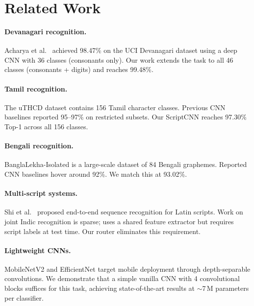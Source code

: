 \documentclass[10pt,twocolumn]{article}
\begin{document}
\section{Related Work}

\paragraph{Devanagari recognition.}
Acharya et al.~\cite{acharya2015} achieved 98.47\% on the UCI Devanagari
dataset using a deep CNN with 36 classes (consonants only).  Our work extends
the task to all 46 classes (consonants + digits) and reaches 99.48\%.

\paragraph{Tamil recognition.}
The uTHCD dataset \cite{uthcd} contains 156 Tamil character classes.  Previous
CNN baselines reported 95--97\% on restricted subsets.  Our ScriptCNN reaches
97.30\% Top-1 across all 156 classes.

\paragraph{Bengali recognition.}
BanglaLekha-Isolated \cite{banglalekha} is a large-scale dataset of 84 Bengali
graphemes.  Reported CNN baselines hover around 92\%.  We match this at 93.02\%.

\paragraph{Multi-script systems.}
Shi et al.~\cite{shi2016} proposed end-to-end sequence recognition for Latin
scripts.  Work on joint Indic recognition is sparse; \cite{paul2020} uses a
shared feature extractor but requires script labels at test time.  Our router
eliminates this requirement.

\paragraph{Lightweight CNNs.}
MobileNetV2 \cite{mobilenet} and EfficientNet \cite{efficientnet} target
mobile deployment through depth-separable convolutions.  We demonstrate that
a simple vanilla CNN with 4 convolutional blocks suffices for this task,
achieving state-of-the-art results at ${\sim}$7\,M parameters per classifier.
\end{document}
